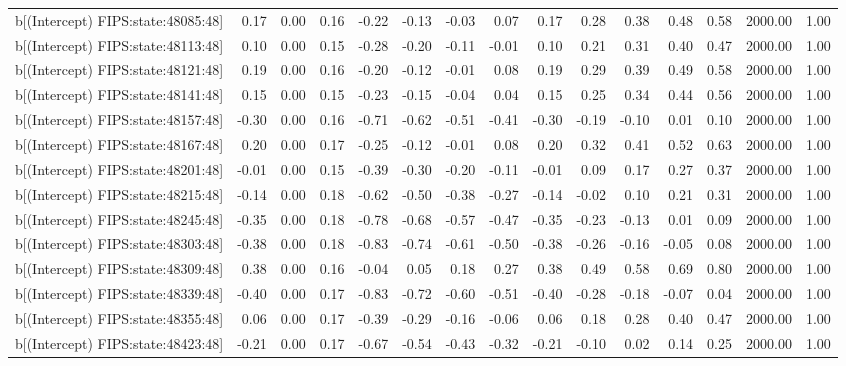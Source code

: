 \begin{table}[ht]
\begin{tabular}{rrrrrrrrrrrrrrr}
  b[(Intercept) FIPS:state:48085:48] & 0.17 & 0.00 & 0.16 & -0.22 & -0.13 & -0.03 & 0.07 & 0.17 & 0.28 & 0.38 & 0.48 & 0.58 & 2000.00 & 1.00 \\ 
  b[(Intercept) FIPS:state:48113:48] & 0.10 & 0.00 & 0.15 & -0.28 & -0.20 & -0.11 & -0.01 & 0.10 & 0.21 & 0.31 & 0.40 & 0.47 & 2000.00 & 1.00 \\ 
  b[(Intercept) FIPS:state:48121:48] & 0.19 & 0.00 & 0.16 & -0.20 & -0.12 & -0.01 & 0.08 & 0.19 & 0.29 & 0.39 & 0.49 & 0.58 & 2000.00 & 1.00 \\ 
  b[(Intercept) FIPS:state:48141:48] & 0.15 & 0.00 & 0.15 & -0.23 & -0.15 & -0.04 & 0.04 & 0.15 & 0.25 & 0.34 & 0.44 & 0.56 & 2000.00 & 1.00 \\ 
  b[(Intercept) FIPS:state:48157:48] & -0.30 & 0.00 & 0.16 & -0.71 & -0.62 & -0.51 & -0.41 & -0.30 & -0.19 & -0.10 & 0.01 & 0.10 & 2000.00 & 1.00 \\ 
  b[(Intercept) FIPS:state:48167:48] & 0.20 & 0.00 & 0.17 & -0.25 & -0.12 & -0.01 & 0.08 & 0.20 & 0.32 & 0.41 & 0.52 & 0.63 & 2000.00 & 1.00 \\ 
  b[(Intercept) FIPS:state:48201:48] & -0.01 & 0.00 & 0.15 & -0.39 & -0.30 & -0.20 & -0.11 & -0.01 & 0.09 & 0.17 & 0.27 & 0.37 & 2000.00 & 1.00 \\ 
  b[(Intercept) FIPS:state:48215:48] & -0.14 & 0.00 & 0.18 & -0.62 & -0.50 & -0.38 & -0.27 & -0.14 & -0.02 & 0.10 & 0.21 & 0.31 & 2000.00 & 1.00 \\ 
  b[(Intercept) FIPS:state:48245:48] & -0.35 & 0.00 & 0.18 & -0.78 & -0.68 & -0.57 & -0.47 & -0.35 & -0.23 & -0.13 & 0.01 & 0.09 & 2000.00 & 1.00 \\ 
  b[(Intercept) FIPS:state:48303:48] & -0.38 & 0.00 & 0.18 & -0.83 & -0.74 & -0.61 & -0.50 & -0.38 & -0.26 & -0.16 & -0.05 & 0.08 & 2000.00 & 1.00 \\ 
  b[(Intercept) FIPS:state:48309:48] & 0.38 & 0.00 & 0.16 & -0.04 & 0.05 & 0.18 & 0.27 & 0.38 & 0.49 & 0.58 & 0.69 & 0.80 & 2000.00 & 1.00 \\ 
  b[(Intercept) FIPS:state:48339:48] & -0.40 & 0.00 & 0.17 & -0.83 & -0.72 & -0.60 & -0.51 & -0.40 & -0.28 & -0.18 & -0.07 & 0.04 & 2000.00 & 1.00 \\ 
  b[(Intercept) FIPS:state:48355:48] & 0.06 & 0.00 & 0.17 & -0.39 & -0.29 & -0.16 & -0.06 & 0.06 & 0.18 & 0.28 & 0.40 & 0.47 & 2000.00 & 1.00 \\ 
  b[(Intercept) FIPS:state:48423:48] & -0.21 & 0.00 & 0.17 & -0.67 & -0.54 & -0.43 & -0.32 & -0.21 & -0.10 & 0.02 & 0.14 & 0.25 & 2000.00 & 1.00 \\ 

\end{tabular}
\end{table}
